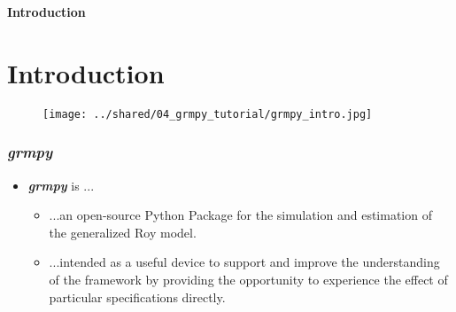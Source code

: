 \begin{frame}\begin{center}
\LARGE\textbf{Introduction}
\end{center}\end{frame}

\section{Introduction}
\begin{frame}
\begin{figure}
  \texttt{[image: ../shared/04\_grmpy\_tutorial/grmpy\_intro.jpg]}
\end{figure}
\end{frame}

\begin{frame}
\frametitle{\textit{grmpy}}

\begin{itemize}\setlength\itemsep{1em}
  \item \textit{\textbf{grmpy}} is ...
    \begin{itemize}\setlength\itemsep{1em}
      \item ...an open-source Python Package for the simulation and estimation of the generalized Roy model.
      \item ...intended as a useful device to support and improve the understanding of the framework by providing the opportunity to experience the effect of particular specifications directly.
    \end{itemize}
\end{itemize}
\end{frame}
